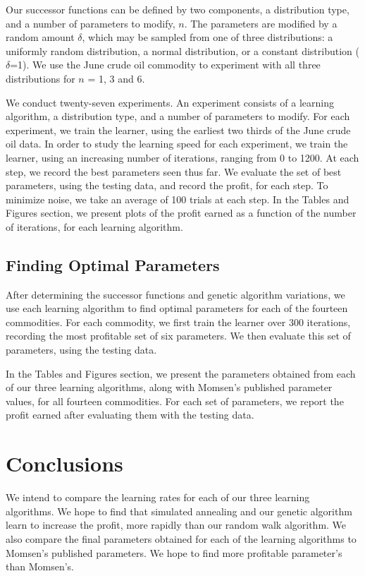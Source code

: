 \documentclass[12pt]{article}
\begin{document}
Our successor functions can be defined by two components, a distribution type,
and a number of parameters to modify, $n$. The parameters are modified by a
random amount $\delta$, which may be sampled from one of three distributions: a
uniformly random distribution, a normal distribution, or a constant distribution
($\delta$=1). We use the June crude oil commodity to experiment with all three
distributions for $n$ = 1, 3 and 6.

We conduct twenty-seven experiments. An experiment consists of a learning
algorithm, a distribution type, and a number of parameters to modify. For each
experiment, we train the learner, using the earliest two thirds of the June
crude oil data. In order to study the learning speed for each experiment, we
train the learner, using an increasing number of iterations, ranging from 0 to
1200.  At each step, we record the best parameters seen thus far.  We evaluate
the set of best parameters, using the testing data, and record the profit, for
each step. To minimize noise, we take an average of 100 trials at each step. In
the Tables and Figures section, we present plots of the profit earned as a
function of the number of iterations, for each learning algorithm.

\subsection{Finding Optimal Parameters}

After determining the successor functions and genetic algorithm variations, we
use each learning algorithm to find optimal parameters for each of the fourteen
commodities. For each commodity, we first train the learner over 300 iterations,
recording the most profitable set of six parameters. We then evaluate this set
of parameters, using the testing data.

In the Tables and Figures section, we present the parameters obtained from each
of our three learning algorithms, along with Momsen's published parameter
values, for all fourteen commodities. For each set of parameters, we report the
profit earned after evaluating them with the testing data.

\section{Conclusions}

We intend to compare the learning rates for each of our three learning
algorithms. We hope to find that simulated annealing and our genetic algorithm
learn to increase the profit, more rapidly than our random walk algorithm. We
also compare the final parameters obtained for each of the learning algorithms
to Momsen's published parameters. We hope to find more profitable parameter's
than Momsen's.
\end{document}
